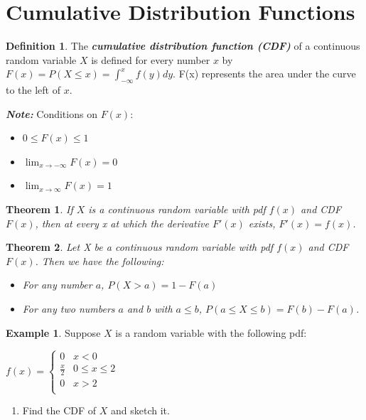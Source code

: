 \documentclass[
  11pt,
  oneside]{book}
\providecommand{\tightlist}{%
  \setlength{\itemsep}{0pt}\setlength{\parskip}{0pt}}
\newtheorem{theorem}{Theorem}[chapter]
\theoremstyle{definition}
\newtheorem{definition}{Definition}[chapter]
\theoremstyle{definition}
\newtheorem{example}{Example}[chapter]
\theoremstyle{definition}
\theoremstyle{definition}
\theoremstyle{remark}
\begin{document}
\section{Cumulative Distribution Functions}\label{cumulative-distribution-functions}

\begin{definition}
The \textbf{\emph{cumulative distribution function (CDF)}} of a continuous random variable \(X\) is defined for every number \(x\) by \(F(x) = P(X \le x) = \int_{-\infty}^x f(y) dy\). F(x) represents the area under the curve to the left of \(x\).
\end{definition}

\textbf{\emph{Note:}} Conditions on \(F(x)\):

\begin{itemize}
\tightlist
\item
  \(0 \le F(x) \le 1\)
\item
  \(\lim_{x \to -\infty} F(x) = 0\)
\item
  \(\lim_{x \to \infty} F(x) = 1\)
\end{itemize}

\begin{theorem}
If \(X\) is a continuous random variable with pdf \(f(x)\) and CDF \(F(x)\), then at every x at which the derivative \(F'(x)\) exists, \(F'(x) = f(x)\).
\end{theorem}

\begin{theorem}

Let X be a continuous random variable with pdf \(f(x)\) and CDF \(F(x)\). Then we have the following:

\begin{itemize}
\tightlist
\item
  For any number \(a\), \(P(X>a) = 1-F(a)\)\\
\item
  For any two numbers \(a\) and \(b\) with \(a \le b\), \(P(a \le X \le b) = F(b) - F(a)\).
\end{itemize}

\end{theorem}

\begin{example}

Suppose \(X\) is a random variable with the following pdf:

\(f(x) =
\begin{cases}
0 & x < 0 \\
\frac{x}{2} & 0 \le x \le 2 \\
0 & x > 2\\
\end{cases}\)

\begin{enumerate}
\def\labelenumi{(\alph{enumi})}
\tightlist
\item
  Find the CDF of \(X\) and sketch it.
\end{enumerate}

\end{example}
\end{document}
